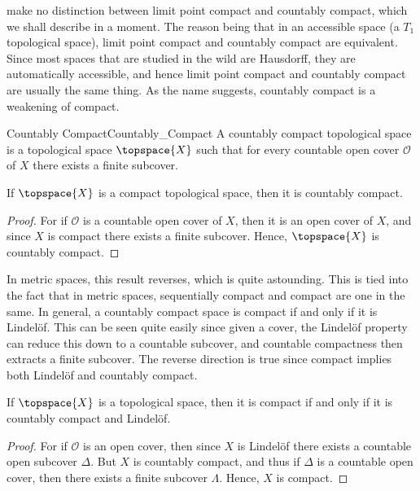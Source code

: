     make no distinction between limit point compact and countably compact,
    which we shall describe in a moment. The reason being that in an
    accessible space (a $T_{1}$ topological space), limit point compact and
    countably compact are equivalent. Since most spaces that are studied in
    the wild are Hausdorff, they are automatically accessible, and hence
    limit point compact and countably compact are usually the same thing.
    As the name suggests, countably compact is a weakening of compact.
    \begin{fdefinition}{Countably Compact}{Countably_Compact}
        A countably compact topological space is a topological space
        $\topspace{X}$ such that for every countable open cover
        $\mathcal{O}$ of $X$ there exists a finite subcover.
    \end{fdefinition}
    \begin{theorem}
        If $\topspace{X}$ is a compact topological space, then it is
        countably compact.
    \end{theorem}
    \begin{proof}
        For if $\mathcal{O}$ is a countable open cover of $X$, then it is
        an open cover of $X$, and since $X$ is compact there exists a finite
        subcover. Hence, $\topspace{X}$ is countably compact.
    \end{proof}
    In metric spaces, this result reverses, which is quite astounding. This
    is tied into the fact that in metric spaces, sequentially compact and
    compact are one in the same. In general, a countably compact space is
    compact if and only if it is Lindel\"{o}f. This can be seen quite easily
    since given a cover, the Lindel\"{o}f property can reduce this down to
    a countable subcover, and countable compactness then extracts a finite
    subcover. The reverse direction is true since compact implies both
    Lindel\"{o}f and countably compact.
    \begin{theorem}
        If $\topspace{X}$ is a topological space, then it is compact if and
        only if it is countably compact and Lindel\"{o}f.
    \end{theorem}
    \begin{proof}
        For if $\mathcal{O}$ is an open cover, then since $X$ is
        Lindel\"{o}f there exists a countable open subcover $\Delta$. But
        $X$ is countably compact, and thus if $\Delta$ is a countable open
        cover, then there exists a finite subcover $\Lambda$. Hence, $X$
        is compact.
    \end{proof}
